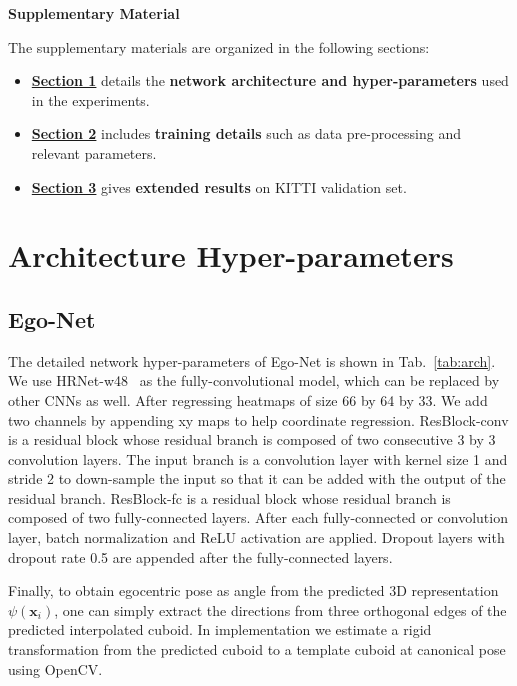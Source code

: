 \documentclass[final]{cvpr}
\begin{document}
{\small
	
	
}

\setcounter{section}{0}
\clearpage
\begin{center}
	\large{\textbf{Supplementary Material}}
\end{center}
The supplementary materials are organized in the following sections:
\begin{itemize}
	\item \hyperref[sec1]{\textbf{Section 1}} details the \textbf{network architecture and hyper-parameters} used in the experiments.
	\item \hyperref[sec2]{\textbf{Section 2}} includes \textbf{training details} such as data pre-processing and relevant parameters.
	\item \hyperref[sec3]{\textbf{Section 3}} gives \textbf{extended results} on KITTI validation set.
\end{itemize}
\section{Architecture Hyper-parameters} \label{sec1}
\subsection{Ego-Net}
The detailed network hyper-parameters of Ego-Net is shown in Tab.~\ref{tab:arch}. We use HRNet-w48~\cite{sun2019deep} as the fully-convolutional model, which can be replaced by other CNNs as well. After regressing heatmaps of size 66 by 64 by 33. We add two channels by appending xy maps to help coordinate regression. ResBlock-conv is a residual block whose residual branch is composed of two consecutive 3 by 3 convolution layers. The input branch is a convolution layer with kernel size 1 and stride 2 to down-sample the input so that it can be added with the output of the residual branch. ResBlock-fc is a residual block whose residual branch is composed of two fully-connected layers. After each fully-connected or convolution layer, batch normalization and ReLU activation are applied. Dropout layers with dropout rate 0.5 are appended after the fully-connected layers.

Finally, to obtain egocentric pose as angle from the predicted 3D representation $\psi(\mathbf{x}_i)$, one can simply extract the directions from three orthogonal edges of the predicted interpolated cuboid. In implementation we estimate a rigid transformation from the predicted cuboid to a template cuboid at canonical pose using OpenCV.
 
\end{document}
